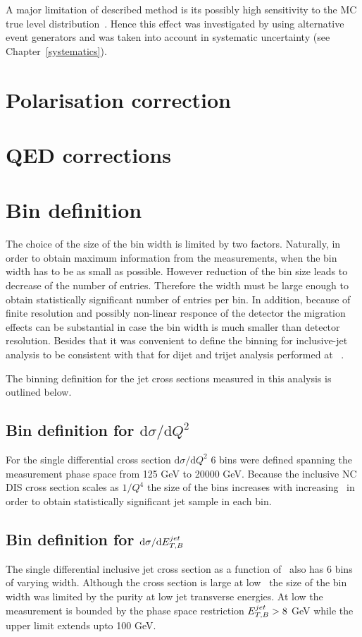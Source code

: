 A major limitation of described method is its possibly high sensitivity to the MC true level distribution~\cite{cowan note}. Hence this effect was investigated by using alternative event generators and was taken into account in systematic uncertainty (see Chapter~\ref{systematics}).

\section{Polarisation correction}

 
\section{QED corrections}


\section{Bin definition}
\label{sec:bindef}
The choice of the size of the bin width is limited by two factors. Naturally, in order to obtain maximum information from the measurements, when the bin width has to be as small as possible. However reduction of the bin size leads to decrease of the number of entries. Therefore the width must be large enough to obtain statistically significant number of entries per bin. In addition, because of finite resolution and possibly non-linear responce of the detector the migration effects can be substantial in case the bin width is much smaller than detector resolution. Besides that it was convenient to define the binning for inclusive-jet analysis to be consistent with that for dijet and trijet analysis performed at \zeus~\cite{joerg Makarenko}.

The binning definition for the jet cross sections measured in this analysis is outlined below.
\subsection{Bin definition for ${\mathrm{d}\sigma}/{\mathrm{d}Q^2}$}
\label{subsec:bindefq2}
For the single differential cross section ${\mathrm{d}\sigma}/{\mathrm{d}Q^2}$ 6 bins were defined spanning the measurement phase space from 125 GeV to 20000 GeV. Because the inclusive NC DIS cross section scales as $1/Q^4$ the size of the bins increases with increasing \qsq~in order to obtain statistically significant jet sample in each bin.
\subsection{Bin definition for ${\mathrm{d}\sigma}/{\mathrm{d}\mbox{$E_{T,B}^{jet}$}}$}
\label{subsec:bindefet}
The single differential inclusive jet cross section as a function of \etjetb~also has 6 bins of varying width. Although the cross section is large at low \etjetb~the size of the bin width was limited by the purity at low jet transverse energies. At low \etjetb the measurement is bounded by the phase space restriction $\mbox{$E_{T,B}^{jet}$} > 8$ GeV while the upper limit extends upto 100 GeV.
